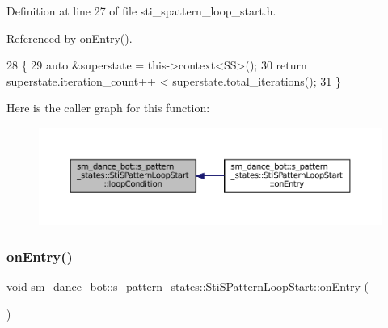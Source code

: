 Definition at line 27 of file sti\+\_\+spattern\+\_\+loop\+\_\+start.\+h.



Referenced by on\+Entry().


\begin{DoxyCode}
28   \{
29     \textcolor{keyword}{auto} &superstate = this->context<SS>();
30     \textcolor{keywordflow}{return} superstate.iteration\_count++ < superstate.total\_iterations();
31   \}
\end{DoxyCode}
Here is the caller graph for this function\+:
\nopagebreak
\begin{figure}[H]
\begin{center}
\leavevmode
\includegraphics[width=350pt]{structsm__dance__bot_1_1s__pattern__states_1_1StiSPatternLoopStart_a6ee8949dad84ea1906ec16f209bac199_icgraph}
\end{center}
\end{figure}
\mbox{\label{structsm__dance__bot_1_1s__pattern__states_1_1StiSPatternLoopStart_a1dccbb9590834aaec90d07dedf0c6d1f}} 
\subsubsection{\texorpdfstring{on\+Entry()}{onEntry()}}
{\footnotesize\ttfamily void sm\+\_\+dance\+\_\+bot\+::s\+\_\+pattern\+\_\+states\+::\+Sti\+S\+Pattern\+Loop\+Start\+::on\+Entry (\begin{DoxyParamCaption}{ }\end{DoxyParamCaption})\hspace{0.3cm}{\ttfamily [inline]}}



